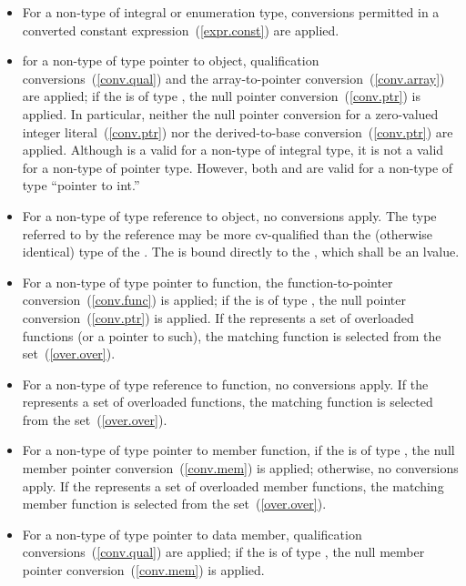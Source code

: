 \begin{itemize}
\item
For a non-type
of integral or enumeration type,
conversions permitted in a converted constant expression~(\ref{expr.const})
are applied.
\item
for a non-type
of type pointer to object,
qualification conversions~(\ref{conv.qual}) and
the array-to-pointer conversion~(\ref{conv.array}) are applied; if the
 is of type , the null
pointer conversion~(\ref{conv.ptr}) is applied.
\enternote
In particular, neither the null pointer conversion for a zero-valued integer
literal~(\ref{conv.ptr}) nor the
derived-to-base conversion~(\ref{conv.ptr}) are applied.
Although
is a valid
for a non-type
of integral type, it is not a valid
for a non-type
of pointer type.
However, both  and  are valid 
for a non-type  of type ``pointer to int.''
\exitnote
\item
For a non-type
of type reference to object,
no conversions apply.
The type referred to by the reference may be more cv-qualified than the
(otherwise identical) type of the
.
The
is bound directly to the
,
which shall be an lvalue.
\item
For a non-type
of type pointer to function, the function-to-pointer conversion~(\ref{conv.func})
is applied; if the  is of type
, the null pointer conversion~(\ref{conv.ptr}) is applied.
If the
represents a set of overloaded functions (or a pointer to such), the matching
function is selected from the set~(\ref{over.over}).
\item
For a non-type
of type reference to function, no conversions apply.
If the
represents a set of overloaded functions, the matching function is selected
from the set~(\ref{over.over}).
\item
For a non-type
of type pointer to member function,
if the  is of type , the
null member pointer conversion~(\ref{conv.mem}) is applied; otherwise,
no conversions apply.
If the
represents a set of overloaded member functions, the matching
member function is selected from the set~(\ref{over.over}).
\item
For a non-type
of type pointer to data member,
qualification conversions~(\ref{conv.qual})
are applied; if the  is of type
, the null member pointer conversion~(\ref{conv.mem}) is
applied.
\end{itemize}

